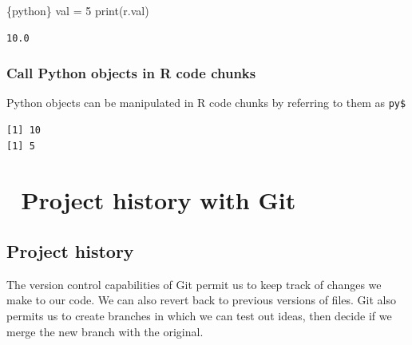 \documentclass[
  letterpaper,
  DIV=11,
  numbers=noendperiod,
  oneside]{scrreprt}
\newenvironment{Shaded}{\begin{snugshade}}{\end{snugshade}}
\newcommand{\BuiltInTok}[1]{\textcolor[rgb]{0.00,0.23,0.31}{#1}}
\newcommand{\DecValTok}[1]{\textcolor[rgb]{0.68,0.00,0.00}{#1}}
\newcommand{\FunctionTok}[1]{\textcolor[rgb]{0.28,0.35,0.67}{#1}}
\newcommand{\InformationTok}[1]{\textcolor[rgb]{0.37,0.37,0.37}{#1}}
\newcommand{\NormalTok}[1]{\textcolor[rgb]{0.00,0.23,0.31}{#1}}
\newcommand{\OperatorTok}[1]{\textcolor[rgb]{0.37,0.37,0.37}{#1}}
\newcommand{\SpecialCharTok}[1]{\textcolor[rgb]{0.37,0.37,0.37}{#1}}
\begin{document}
\begin{Shaded}
\begin{Highlighting}[]
\InformationTok{\textasciigrave{}\textasciigrave{}\textasciigrave{}\{python\}}
\NormalTok{val }\OperatorTok{=} \DecValTok{5}
\BuiltInTok{print}\NormalTok{(r.val)}
\InformationTok{\textasciigrave{}\textasciigrave{}\textasciigrave{}}
\end{Highlighting}
\end{Shaded}

\begin{verbatim}
10.0
\end{verbatim}

\hypertarget{call-python-objects-in-r-code-chunks}{%
\subsection{Call Python objects in R code
chunks}\label{call-python-objects-in-r-code-chunks}}

Python objects can be manipulated in R code chunks by referring to them
as \texttt{py\$}

\begin{Shaded}
\end{Shaded}

\begin{verbatim}
[1] 10
[1] 5
\end{verbatim}

\hypertarget{project-history-with-git}{%
\chapter{\texorpdfstring{{📘} Project history with
Git}{📘 Project history with Git}}\label{project-history-with-git}}

\hypertarget{project-history}{%
\section{Project history}\label{project-history}}

The version control capabilities of Git permit us to keep track of
changes we make to our code. We can also revert back to previous
versions of files. Git also permits us to create branches in which we
can test out ideas, then decide if we merge the new branch with the
original.
\end{document}

